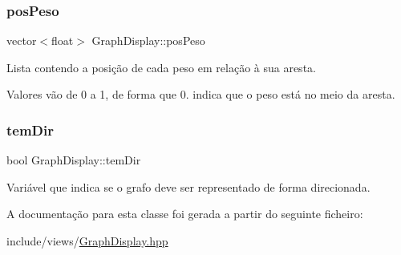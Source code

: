 \subsubsection{\texorpdfstring{pos\+Peso}{posPeso}}
{\footnotesize\ttfamily vector$<$float$>$ Graph\+Display\+::pos\+Peso}

Lista contendo a posição de cada peso em relação à sua aresta.

Valores vão de 0 a 1, de forma que 0. indica que o peso está no meio da aresta. \mbox{\label{classGraphDisplay_a9d9f390d193fda9a5503b7629fd50bf3}} 
\subsubsection{\texorpdfstring{tem\+Dir}{temDir}}
{\footnotesize\ttfamily bool Graph\+Display\+::tem\+Dir}

Variável que indica se o grafo deve ser representado de forma direcionada. 

A documentação para esta classe foi gerada a partir do seguinte ficheiro\+:\begin{DoxyCompactItemize}
\item 
include/views/\hyperlink{GraphDisplay_8hpp}{Graph\+Display.\+hpp}\end{DoxyCompactItemize}
